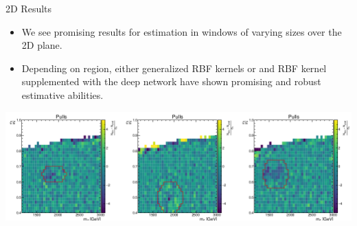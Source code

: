 \documentclass[10pt]{beamer}
\begin{document}
\begin{frame}{2D Results}
  \begin{itemize}
  \item We see promising results for estimation in windows of varying sizes over the 2D plane. 
  \item Depending on region, either generalized RBF kernels or and RBF kernel supplemented with the deep network have shown promising and robust estimative abilities.
  \end{itemize}

  \begin{center}
    \includegraphics[width=\textwidth]{figures/nn_results_1} 
  \end{center}
\end{frame}
\end{document}
